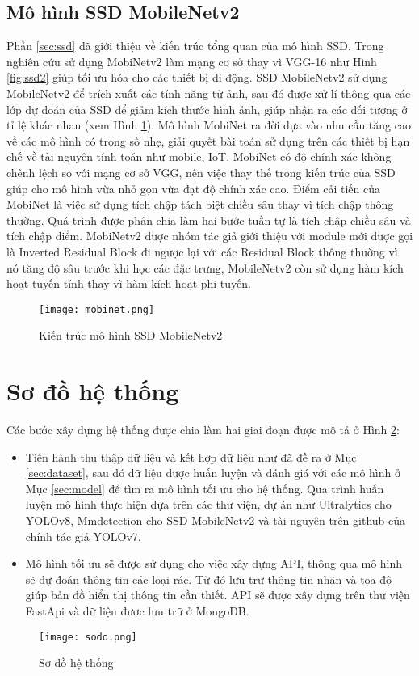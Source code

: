 \documentclass[../the.tex]{subfiles}
\begin{document}
\subsection{Mô hình SSD MobileNetv2}
{\fontsize{13}{12} \selectfont

	Phần \ref{sec:ssd} đã giới thiệu về kiến trúc tổng quan của mô hình SSD. Trong nghiên cứu sử dụng MobiNetv2 \cite{sandler2019mobilenetv2} làm mạng cơ sở thay vì VGG-16 như Hình \ref{fig:ssd2} giúp tối ưu hóa cho các thiết bị di động. SSD MobileNetv2 sử dụng MobileNetv2 để trích xuất các tính năng từ ảnh, sau đó được xử lí thông qua các lớp dự đoán của SSD để giảm kích thước hình ảnh, giúp nhận ra các đối tượng ở tỉ lệ khác nhau (xem Hình \ref{fig:mobinet}).
	Mô hình MobiNet ra đời dựa vào nhu cầu tăng cao về các mô hình có trọng số nhẹ, giải quyết bài toán sử dụng trên các thiết bị hạn chế về tài nguyên tính toán như mobile, IoT. MobiNet có độ chính xác không chênh lệch so với mạng cơ sở VGG, nên việc thay thế trong kiến trúc của SSD giúp cho mô hình vừa nhỏ gọn vừa đạt độ chính xác cao.
	Điểm cải tiến của MobiNet là việc sử dụng tích chập tách biệt chiều sâu thay vì tích chập thông thường. Quá trình được phân chia làm hai bước tuần tự là tích chập chiều sâu và tích chập điểm.
	MobiNetv2 được nhóm tác giả giới thiệu với module mới được gọi là Inverted Residual Block đi ngược lại với các Residual Block thông thường vì nó tăng độ sâu trước khi học các đặc trưng, MobileNetv2 còn sử dụng hàm kích hoạt tuyến tính thay vì hàm kích hoạt phi tuyến.

}

\begin{figure}[H]
	\centering
	\texttt{[image: mobinet.png]}
	\caption{Kiến trúc mô hình SSD MobileNetv2}
	\label{fig:mobinet}
\end{figure}

\section{Sơ đồ hệ thống}
\label{sec:sodo}
{\fontsize{13}{12} \selectfont

	Các bước xây dựng hệ thống được chia làm hai giai đoạn được mô tả ở Hình \ref{fig:sodo}:

	\begin{itemize}
		\item Tiến hành thu thập dữ liệu và kết hợp dữ liệu như đã đề ra ở Mục \ref{sec:dataset}, sau đó dữ liệu được huấn luyện và đánh giá với các mô hình ở Mục \ref{sec:model} để tìm ra mô hình tối ưu cho hệ thống.
		      Qua trình huấn luyện mô hình thực hiện dựa trên các thư viện, dự án như Ultralytics cho YOLOv8, Mmdetection cho SSD MobileNetv2 và tài nguyên trên github của chính tác giả YOLOv7.
		\item Mô hình tối ưu sẽ được sử dụng cho việc xây dựng API, thông qua mô hình sẽ dự đoán thông tin các loại rác. Từ đó lưu trữ thông tin nhãn và tọa độ giúp bản đồ hiển thị thông tin cần thiết.
		      API sẽ được xây dựng trên thư viện FastApi và dữ liệu được lưu trữ ở MongoDB.
	\end{itemize}

}

\begin{figure}[H]
	\centering
	\texttt{[image: sodo.png]}
	\caption{Sơ đồ hệ thống}
	\label{fig:sodo}
\end{figure}
\end{document}
